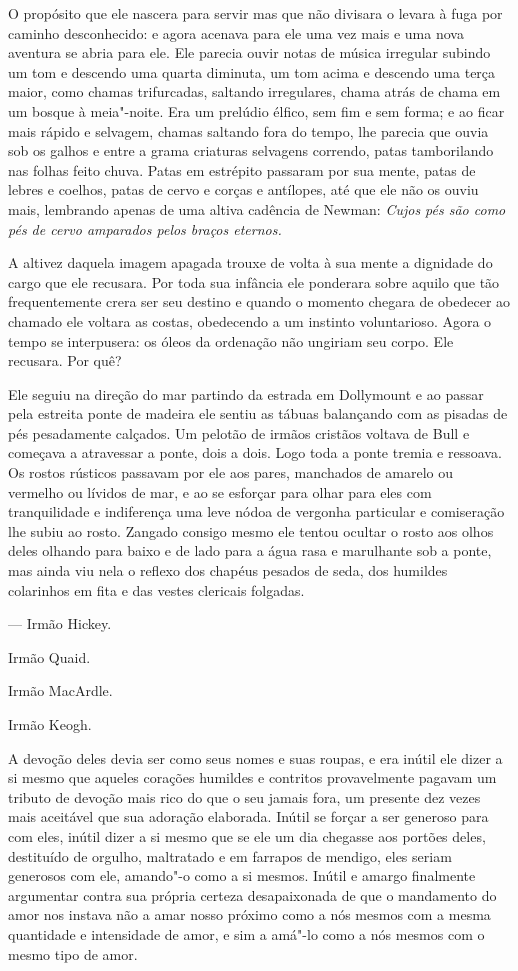 O propósito que ele nascera para servir mas que não divisara o levara à
fuga por caminho desconhecido: e agora acenava para ele uma vez mais e
uma nova aventura se abria para ele. Ele parecia ouvir notas de música
irregular subindo um tom e descendo uma quarta diminuta, um tom acima e
descendo uma terça maior, como chamas trifurcadas, saltando
irregulares, chama atrás de chama em um bosque à meia"-noite. Era um
prelúdio élfico, sem fim e sem forma; e ao ficar mais rápido e
selvagem, chamas saltando fora do tempo, lhe parecia que ouvia sob os
galhos e entre a grama criaturas selvagens correndo, patas tamborilando
nas folhas feito chuva. Patas em estrépito passaram por sua mente,
patas de lebres e coelhos, patas de cervo e corças e antílopes, até que
ele não os ouviu mais, lembrando apenas de uma altiva cadência de
Newman: \textit{Cujos pés são como pés de cervo amparados pelos braços 
eternos.}

A altivez daquela imagem apagada trouxe de volta à sua mente a dignidade
do cargo que ele recusara. Por toda sua infância ele ponderara sobre
aquilo que tão frequentemente crera ser seu destino e quando o
momento chegara de obedecer ao chamado ele voltara as costas,
obedecendo a um instinto voluntarioso. Agora o tempo se interpusera: os
óleos da ordenação não ungiriam seu corpo. Ele recusara. Por quê?

Ele seguiu na direção do mar partindo da estrada em Dollymount e ao
passar pela estreita ponte de madeira ele sentiu as tábuas balançando
com as pisadas de pés pesadamente calçados. Um pelotão de irmãos
cristãos voltava de Bull e começava a atravessar a ponte, dois a dois.
Logo toda a ponte tremia e ressoava. Os rostos rústicos passavam por
ele aos pares, manchados de amarelo ou vermelho ou lívidos de mar, e ao
se esforçar para olhar para eles com tranquilidade e indiferença uma
leve nódoa de vergonha particular e comiseração lhe subiu ao rosto.
Zangado consigo mesmo ele tentou ocultar o rosto aos olhos deles
olhando para baixo e de lado para a água rasa e marulhante sob a ponte,
mas ainda viu nela o reflexo dos chapéus pesados de seda, dos
humildes colarinhos em fita e das vestes clericais folgadas.

 --- Irmão Hickey.

Irmão Quaid.

Irmão MacArdle.

Irmão Keogh.

A devoção deles devia ser como seus nomes e suas roupas, e era inútil
ele dizer a si mesmo que aqueles corações humildes e contritos
provavelmente pagavam um tributo de devoção mais rico do que o seu
jamais fora, um presente dez vezes mais aceitável que sua adoração
elaborada. Inútil se forçar a ser generoso para com eles, inútil dizer
a si mesmo que se ele um dia chegasse aos portões deles, destituído de
orgulho, maltratado e em farrapos de mendigo, eles seriam generosos com
ele, amando"-o como a si mesmos. Inútil e amargo finalmente argumentar
contra sua própria certeza desapaixonada de que o mandamento do amor nos
instava não a amar nosso próximo como a nós mesmos com a mesma
quantidade e intensidade de amor, e sim a amá"-lo como a nós mesmos
com o mesmo tipo de amor.

